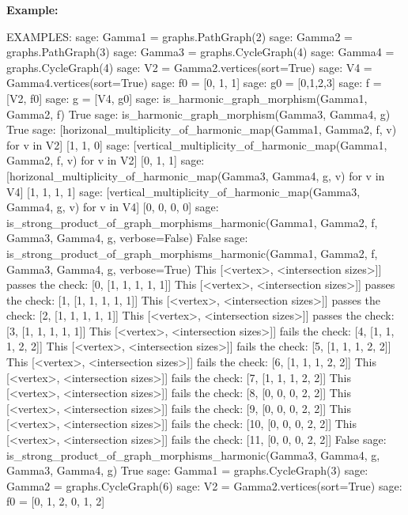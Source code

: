 \documentclass{article}
\begin{document}
\textbf{Example:}
\begin{spverbatim}
EXAMPLES:
    sage: Gamma1 = graphs.PathGraph(2)
    sage: Gamma2 = graphs.PathGraph(3)
    sage: Gamma3 = graphs.CycleGraph(4)
    sage: Gamma4 = graphs.CycleGraph(4) 
    sage: V2 = Gamma2.vertices(sort=True)
    sage: V4 = Gamma4.vertices(sort=True)
    sage: f0 = [0, 1, 1]
    sage: g0 = [0,1,2,3] 
    sage: f = [V2, f0] 
    sage: g = [V4, g0]
    sage: is_harmonic_graph_morphism(Gamma1, Gamma2, f)
    True
    sage: is_harmonic_graph_morphism(Gamma3, Gamma4, g)
    True
    sage: [horizonal_multiplicity_of_harmonic_map(Gamma1, Gamma2, f, v) for v in V2]
    [1, 1, 0]
    sage: [vertical_multiplicity_of_harmonic_map(Gamma1, Gamma2, f, v) for v in V2]
    [0, 1, 1]
    sage: [horizonal_multiplicity_of_harmonic_map(Gamma3, Gamma4, g, v) for v in V4]
    [1, 1, 1, 1]
    sage: [vertical_multiplicity_of_harmonic_map(Gamma3, Gamma4, g, v) for v in V4]
    [0, 0, 0, 0]
    sage: is_strong_product_of_graph_morphisms_harmonic(Gamma1, Gamma2, f, Gamma3, Gamma4, g, verbose=False)  
    False
    sage: is_strong_product_of_graph_morphisms_harmonic(Gamma1, Gamma2, f, Gamma3, Gamma4, g, verbose=True)   
    This [<vertex>, <intersection sizes>]] passes the check: [0, [1, 1, 1, 1, 1]]
    This [<vertex>, <intersection sizes>]] passes the check: [1, [1, 1, 1, 1, 1]]
    This [<vertex>, <intersection sizes>]] passes the check: [2, [1, 1, 1, 1, 1]]
    This [<vertex>, <intersection sizes>]] passes the check: [3, [1, 1, 1, 1, 1]]
    This [<vertex>, <intersection sizes>]] fails the check: [4, [1, 1, 1, 2, 2]]
    This [<vertex>, <intersection sizes>]] fails the check: [5, [1, 1, 1, 2, 2]]
    This [<vertex>, <intersection sizes>]] fails the check: [6, [1, 1, 1, 2, 2]]
    This [<vertex>, <intersection sizes>]] fails the check: [7, [1, 1, 1, 2, 2]]
    This [<vertex>, <intersection sizes>]] fails the check: [8, [0, 0, 0, 2, 2]]
    This [<vertex>, <intersection sizes>]] fails the check: [9, [0, 0, 0, 2, 2]]
    This [<vertex>, <intersection sizes>]] fails the check: [10, [0, 0, 0, 2, 2]]
    This [<vertex>, <intersection sizes>]] fails the check: [11, [0, 0, 0, 2, 2]]
    False
    sage: is_strong_product_of_graph_morphisms_harmonic(Gamma3, Gamma4, g, Gamma3, Gamma4, g)    
    True
    sage: Gamma1 = graphs.CycleGraph(3)                                                          
    sage: Gamma2 = graphs.CycleGraph(6)                                                          
    sage: V2 = Gamma2.vertices(sort=True)                                                        
    sage: f0 = [0, 1, 2, 0, 1, 2]                                                                

\end{spverbatim}
\end{document}
